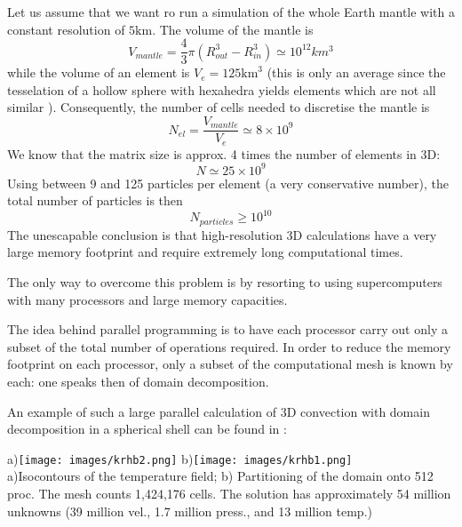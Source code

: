
Let us assume that we want ro run a simulation of the whole Earth mantle
with a constant resolution of $5\text{km}$. The volume of the mantle is
\[
V_{mantle}=\frac{4}{3}\pi (R_{out}^3-R_{in}^3) \simeq  10^{12}  km^3
\]
while the volume of an element is $V_{e} = 125 \text{km}^3$ (this is 
only an average since the tesselation of a hollow sphere with 
hexahedra yields elements which are not all similar \cite{thie18}).
Consequently, the number of cells needed to discretise the mantle
is 
\[
N_{el}=\frac{V_{mantle}}{V_{e}}\simeq 8\times 10^9
\]
We know that the matrix size is approx. 4 times the number of elements in 3D:
\[
N\simeq 25 \times 10^9
\]
Using between 9 and 125 particles per element (a very conservative number),
the total number of particles is then
\[
N_{particles}  \geq 10^{10}
\]
The unescapable conclusion is that high-resolution 3D 
calculations 
 have a very large memory footprint and require extremely long computational times.

The only way to overcome this problem is by resorting to 
using supercomputers with many processors and large memory capacities.

The idea behind parallel programming is to have each processor carry out 
only a subset of the total number of operations required. In order to reduce 
the memory footprint on each processor, only a subset of the computational
mesh is known by each: one speaks then of domain decomposition.

An example of such a large parallel calculation of 3D convection with 
domain decomposition in a spherical shell can be found in \cite{krhb12}:

\begin{center}
a)\texttt{[image: images/krhb2.png]}
b)\texttt{[image: images/krhb1.png]} \\
{\small a)Isocontours of the temperature field; b) Partitioning of the domain onto 512 proc. The mesh counts 1,424,176 cells. The solution has approximately 54 million unknowns (39 million vel., 1.7 million press., and 13 million temp.)
}
\end{center}



